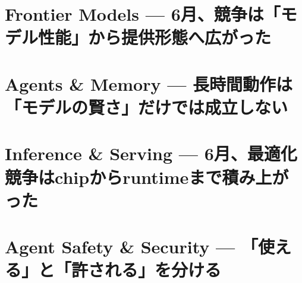 \documentclass[lualatex,a4paper,11pt]{jlreq}
\begin{document}
\surveycover
\clearpage


\clearpage
\section{Frontier Models — 6月、競争は「モデル性能」から提供形態へ広がった}
\label{pkg:frontier-models-june}
\vspace{0.15em}
\begin{multicols}{2}

\end{multicols}
\Needspace{0.34\textheight}

\medskip


\Needspace{0.45\textheight}
\bigskip
\section{Agents \& Memory — 長時間動作は「モデルの賢さ」だけでは成立しない}
\label{pkg:agents-memory-june}
\vspace{0.15em}
\begin{multicols}{2}

\end{multicols}
\Needspace{0.34\textheight}

\medskip


\Needspace{0.45\textheight}
\bigskip
\section{Inference \& Serving — 6月、最適化競争はchipからruntimeまで積み上がった}
\label{pkg:inference-serving-june}
\vspace{0.15em}
\begin{multicols}{2}

\end{multicols}
\Needspace{0.34\textheight}

\medskip


\Needspace{0.45\textheight}
\bigskip
\section{Agent Safety \& Security — 「使える」と「許される」を分ける}
\label{pkg:agent-safety-security-june}
\vspace{0.15em}
\begin{multicols}{2}

\end{multicols}
\Needspace{0.34\textheight}

\medskip

\end{document}
